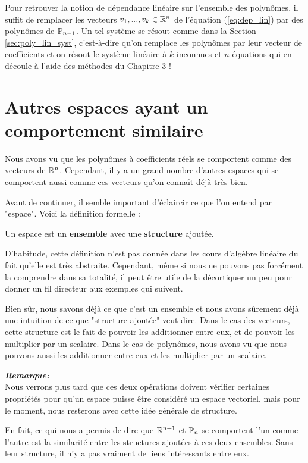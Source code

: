 Pour retrouver la notion de dépendance linéaire sur l'ensemble des polynômes, il suffit de remplacer les vecteurs $v_1,...,v_k \in \R^n$ de l'équation (\ref{eq:dep_lin}) par des polynômes de $\P_{n-1}$. Un tel système se résout comme dans la Section \ref{sec:poly_lin_syst}, c'est-à-dire qu'on remplace les polynômes par leur vecteur de coefficients et on résout le système linéaire à $k$ inconnues et $n$ équations qui en découle à l'aide des méthodes du Chapitre 3 !


\section{Autres espaces ayant un comportement similaire}

Nous avons vu que les polynômes à coefficients réels se comportent comme des vecteurs de $\R^n$. Cependant, il y a un grand nombre d'autres espaces qui se comportent aussi comme ces vecteurs qu'on connaît déjà très bien.

Avant de continuer, il semble important d'éclaircir ce que l'on entend par "espace". Voici la définition formelle :

\begin{boxdef} [Espace]
    Un espace est un \textbf{ensemble} avec une \textbf{structure} ajoutée.
\end{boxdef}

D'habitude, cette définition n'est pas donnée dans les cours d'algèbre linéaire du fait qu'elle est très abstraite. Cependant, même si nous ne pouvons pas forcément la comprendre dans sa totalité, il peut être utile de la décortiquer un peu pour donner un fil directeur aux exemples qui suivent.

Bien sûr, nous savons déjà ce que c'est un ensemble et nous avons sûrement déjà une intuition de ce que "structure ajoutée" veut dire. Dans le cas des vecteurs, cette structure est le fait de pouvoir les additionner entre eux, et de pouvoir les multiplier par un scalaire. Dans le cas de polynômes, nous avons vu que nous pouvons aussi les additionner entre eux et les multiplier par un scalaire.

\textit{\textbf{Remarque:}} \\
Nous verrons plus tard que ces deux opérations doivent vérifier certaines propriétés pour qu'un espace puisse être considéré un espace vectoriel, mais pour le moment, nous resterons avec cette idée générale de structure.

En fait, ce qui nous a permis de dire que $\R^{n+1}$ et $\P_n$ se comportent l'un comme l'autre est la similarité entre les structures ajoutées à ces deux ensembles. Sans leur structure, il n'y a pas vraiment de liens intéressants entre eux. 

